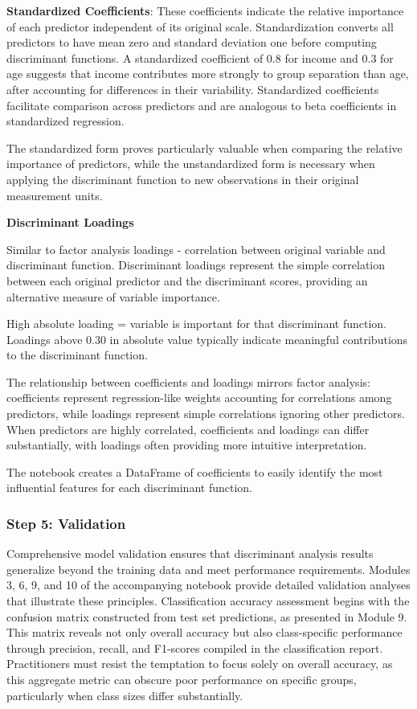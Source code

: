 \documentclass[
]{article}
\begin{document}
\textbf{Standardized Coefficients}: These coefficients indicate the
relative importance of each predictor independent of its original scale.
Standardization converts all predictors to have mean zero and standard
deviation one before computing discriminant functions. A standardized
coefficient of 0.8 for income and 0.3 for age suggests that income
contributes more strongly to group separation than age, after accounting
for differences in their variability. Standardized coefficients
facilitate comparison across predictors and are analogous to beta
coefficients in standardized regression.

The standardized form proves particularly valuable when comparing the
relative importance of predictors, while the unstandardized form is
necessary when applying the discriminant function to new observations in
their original measurement units.

\textbf{Discriminant Loadings}

Similar to factor analysis loadings - correlation between original
variable and discriminant function. Discriminant loadings represent the
simple correlation between each original predictor and the discriminant
scores, providing an alternative measure of variable importance.

High absolute loading = variable is important for that discriminant
function. Loadings above 0.30 in absolute value typically indicate
meaningful contributions to the discriminant function.

The relationship between coefficients and loadings mirrors factor
analysis: coefficients represent regression-like weights accounting for
correlations among predictors, while loadings represent simple
correlations ignoring other predictors. When predictors are highly
correlated, coefficients and loadings can differ substantially, with
loadings often providing more intuitive interpretation.

The notebook creates a DataFrame of coefficients to easily identify the
most influential features for each discriminant function.

\subsubsection{Step 5: Validation}

Comprehensive model validation ensures that discriminant analysis
results generalize beyond the training data and meet performance
requirements. Modules 3, 6, 9, and 10 of the accompanying notebook
provide detailed validation analyses that illustrate these principles.
Classification accuracy assessment begins with the confusion matrix
constructed from test set predictions, as presented in Module 9. This
matrix reveals not only overall accuracy but also class-specific
performance through precision, recall, and F1-scores compiled in the
classification report. Practitioners must resist the temptation to focus
solely on overall accuracy, as this aggregate metric can obscure poor
performance on specific groups, particularly when class sizes differ
substantially.
\end{document}
